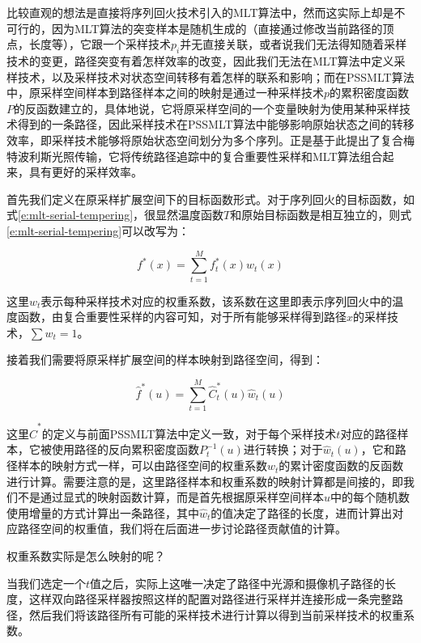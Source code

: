 比较直观的想法是直接将序列回火技术引入的MLT算法中，然而这实际上却是不可行的，因为MLT算法的突变样本是随机生成的（直接通过修改当前路径的顶点，长度等），它跟一个采样技术$p_i$并无直接关联，或者说我们无法得知随着采样技术的变更，路径突变有着怎样效率的改变，因此我们无法在MLT算法中定义采样技术，以及采样技术对状态空间转移有着怎样的联系和影响；而在PSSMLT算法中，原采样空间样本到路径样本之间的映射是通过一种采样技术$p$的累积密度函数$P$的反函数建立的，具体地说，它将原采样空间的一个变量映射为使用某种采样技术得到的一条路径，因此采样技术在PSSMLT算法中能够影响原始状态之间的转移效率，即采样技术能够将原始状态空间划分为多个序列。\cite{a:MultiplexedMetropolisLightTransport}正是基于此提出了复合梅特波利斯光照传输，它将传统路径追踪中的复合重要性采样和MLT算法组合起来，具有更好的采样效率。

首先我们定义在原采样扩展空间下的目标函数形式。对于序列回火的目标函数，如式\ref{e:mlt-serial-tempering}，很显然温度函数$T$和原始目标函数是相互独立的，则式\ref{e:mlt-serial-tempering}可以改写为：

\begin{equation}\label{e:mlt-pssmlt-tempering}
	f^{*}({x})=\sum^{M}_{t=1}f^{*}_t({x})w_t({x})
\end{equation}

\noindent 这里$w_t$表示每种采样技术对应的权重系数，该系数在这里即表示序列回火中的温度函数，由复合重要性采样的内容可知，对于所有能够采样得到路径${x}$的采样技术，$\sum w_t=1$。

接着我们需要将原采样扩展空间的样本映射到路径空间，得到：

\begin{equation}
	\hat{f}^{*}({u})=\sum^{M}_{t=1}\hat{C}^{*}_t({u})\hat{w}_t({u})
\end{equation}

\noindent 这里$\hat{C}^{*}$的定义与前面PSSMLT算法中定义一致，对于每个采样技术$t$对应的路径样本，它被使用路径的反向累积密度函数$P^{-1}_t({u})$进行转换；对于$\hat{w}_t({u})$，它和路径样本的映射方式一样，可以由路径空间的权重系数$w_t$的累计密度函数的反函数进行计算。需要注意的是，这里路径样本和权重系数的映射计算都是间接的，即我们不是通过显式的映射函数计算，而是首先根据原采样空间样本${u}$中的每个随机数使用增量的方式计算出一条路径，其中$\hat{w}_t$的值决定了路径的长度，进而计算出对应路径空间的权重值，我们将在后面进一步讨论路径贡献值的计算。

\begin{myshaded}
	权重系数实际是怎么映射的呢？
	
	当我们选定一个$t$值之后，实际上这唯一决定了路径中光源和摄像机子路径的长度，这样双向路径采样器按照这样的配置对路径进行采样并连接形成一条完整路径，然后我们将该路径所有可能的采样技术进行计算以得到当前采样技术的权重系数。
\end{myshaded}

